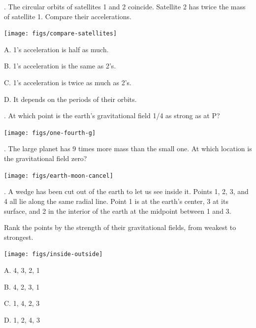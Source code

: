 \documentclass[20pt]{extarticle}
\begin{document}
. The circular orbits of satellites 1 and 2 coincide. Satellite 2 has
twice the mass of satellite 1. Compare their accelerations.

\vspace{20mm}

\texttt{[image: figs/compare-satellites]}

A. 1's acceleration is half as much.

B. 1's acceleration is the same as 2's.

C. 1's acceleration is twice as much as 2's.

D. It depends on the periods of their orbits.

\pagebreak



. At which point is the earth's gravitational field 1/4 as strong as at P?

\vspace{20mm}

\texttt{[image: figs/one-fourth-g]}

\pagebreak


. The large planet has 9 times more mass than the small one.
At which location is the gravitational field zero?

\vspace{20mm}

\texttt{[image: figs/earth-moon-cancel]}

\pagebreak



. A wedge has been cut out of the earth to let us see inside it.
Points 1, 2, 3, and 4 all lie along the same radial line. Point 1 is at the
earth's center, 3 at its surface, and 2 in the interior of the earth at the
midpoint between 1 and 3.

Rank the points by the strength of their gravitational fields, from weakest
to strongest.

\texttt{[image: figs/inside-outside]}

A. 4, 3, 2, 1

B. 4, 2, 3, 1

C. 1, 4, 2, 3

D. 1, 2, 4, 3


\pagebreak
\end{document}
